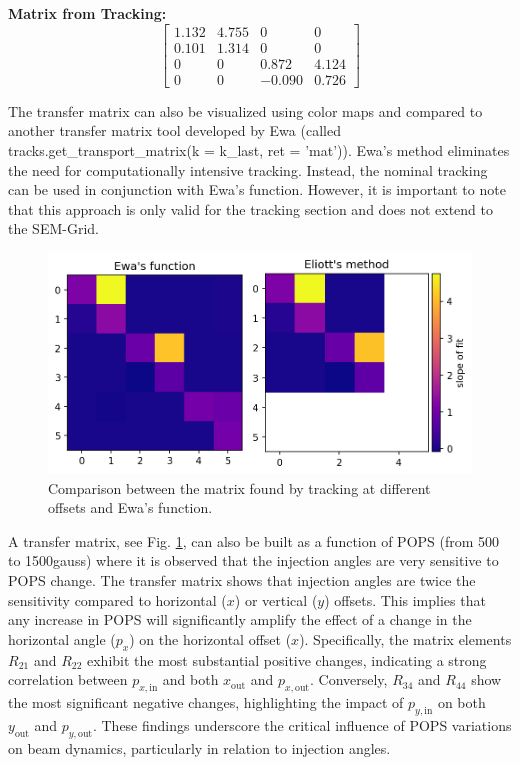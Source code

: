 \textbf{Matrix from Tracking:}
\[
\begin{bmatrix}
1.132 & 4.755 & 0 & 0 \\
0.101 & 1.314 & 0 & 0 \\
0 & 0 & 0.872 & 4.124 \\
0 & 0 & -0.090 & 0.726
\end{bmatrix}
\]

The transfer matrix can also be visualized using color maps and compared to another transfer matrix tool developed by Ewa (called tracks.get\_transport\_matrix(k = k\_last, ret = 'mat')). Ewa's method eliminates the need for computationally intensive tracking. Instead, the nominal tracking can be used in conjunction with Ewa's function. However, it is important to note that this approach is only valid for the tracking section and does not extend to the SEM-Grid.

\begin{figure}[H]
\centering
\includegraphics[width=1.0\textwidth]{02_Simulation/images/transfer_matrix_color.png}
\caption{Comparison between the matrix found by tracking at different offsets and Ewa's function.}
\label{fig:transfer_matrix_color}
\end{figure}





A transfer matrix, see Fig. \ref{fig:transfer_matrix_color}, can also be built as a function of POPS (from \si{500} to \si{1500}{gauss}) where it is observed that the injection angles are very sensitive to POPS change. The transfer matrix shows that injection angles are twice the sensitivity compared to horizontal (\(x\)) or vertical (\(y\)) offsets. This implies that any increase in POPS will significantly amplify the effect of a change in the horizontal angle (\(p_x\)) on the horizontal offset (\(x\)). Specifically, the matrix elements \(R_{21}\) and \(R_{22}\) exhibit the most substantial positive changes, indicating a strong correlation between \(p_{x,\text{in}}\) and both \(x_{\text{out}}\) and \(p_{x,\text{out}}\). Conversely, \(R_{34}\) and \(R_{44}\) show the most significant negative changes, highlighting the impact of \(p_{y,\text{in}}\) on both \(y_{\text{out}}\) and \(p_{y,\text{out}}\). These findings underscore the critical influence of POPS variations on beam dynamics, particularly in relation to injection angles.

